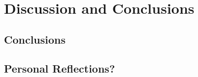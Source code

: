 
\chapter{Discussion and Conclusions}
\label{chap:discussion_and_conclusions}
\noindent \lipsum[1]

\section{Conclusions}
\label{sec:conclusions}

\noindent \lipsum[1]

\section{Personal Reflections?}
\noindent \lipsum[1]

